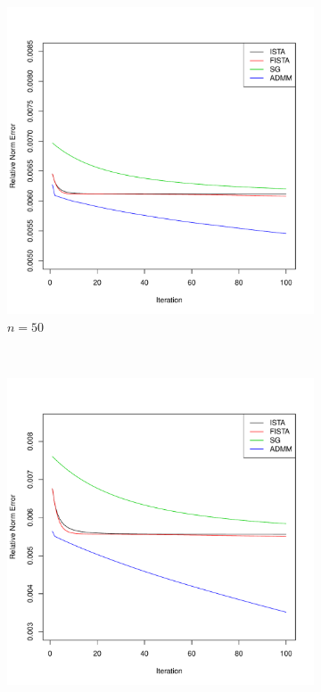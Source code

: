 \documentclass[12pt, leqno]{article}
\theoremstyle{remark}
\begin{document}
\begin{figure}[H]
\begin{subfigure}[b]{0.4\textwidth}
        \includegraphics[width=\textwidth]{50cvgc2.pdf}
        \caption{$n=50$}
        \label{fig:50}
    \end{subfigure}
\\
    \begin{subfigure}[b]{0.4\textwidth}
        \includegraphics[width=\textwidth]{100cvgc2.pdf}

\end{subfigure}
\end{figure}
\end{document}
